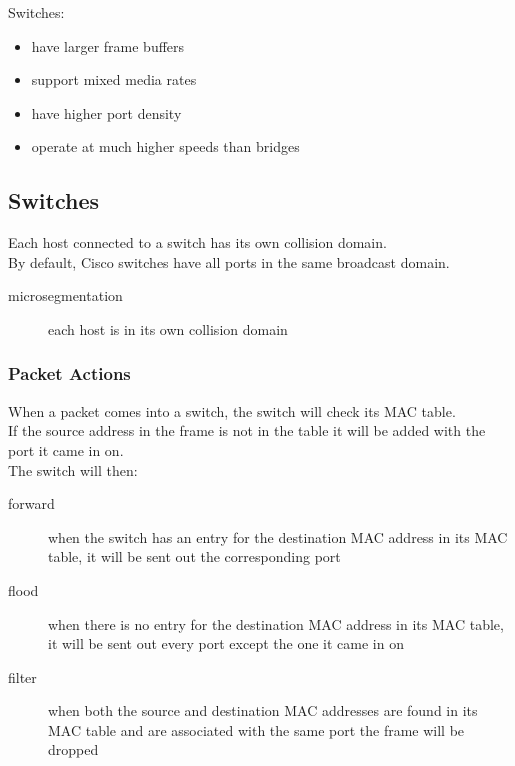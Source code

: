 Switches:

\begin{itemize}

\item have larger frame buffers

\item support mixed media rates

\item have higher port density

\item operate at much higher speeds than bridges

\end{itemize} 

\subsection{Switches}

Each host connected to a switch has its own collision domain.\\

By default, Cisco switches have all ports in the same broadcast domain.

\begin{description}

\item[microsegmentation]
each host is in its own collision domain

\end{description}

\subsubsection{Packet Actions}

When a packet comes into a switch, the switch will check its MAC table.\\

If the source address in the frame is not in the table it will be added
with the port it came in on.\\

The switch will then:\\

\begin{description}

\item[forward]
when the switch has an entry for the destination MAC address in its MAC table,
it will be sent out the corresponding port

\item[flood]
when there is no entry for the destination MAC address in its MAC table,
it will be sent out every port except the one it came in on

\item[filter]
when both the source and destination MAC addresses are found in its MAC table
and are associated with the same port the frame will be dropped

\end{description}

